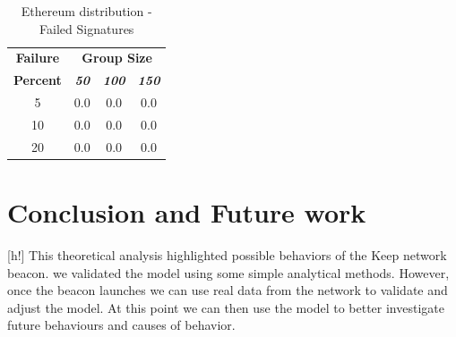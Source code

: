 \documentclass[conference]{IEEEtran}
\begin{document}
        \begin{table}[h!]
            \caption{Ethereum distribution - Failed Signatures}
            \begin{center}
            \begin{tabular}{|c|c|c|c|}
            \hline
            \textbf{Failure}&\multicolumn{3}{|c|}{\textbf{Group Size}} \\
            \cline{2-4} 
            \textbf{Percent} & \textbf{\textit{50}}& \textbf{\textit{100}}& \textbf{\textit{150}} \\
            \hline
            5 &  0.0 &  0.0 &  0.0 \\
            \hline
            10 &  0.0 &  0.0 &  0.0 \\
            \hline
            20 &  0.0 &  0.0 &  0.0 \\
            \hline
            \end{tabular}
            \label{failed_table2}
            \end{center}
        \end{table}

\newpage
\section{Conclusion and Future work}[h!]
This theoretical analysis highlighted possible behaviors of the Keep network beacon. we
validated the model using some simple analytical methods. However, once the beacon launches
we can use real data from the network to validate and adjust the model. At this point we can
then use the model to better investigate future behaviours and causes of behavior. 


\newpage


\end{document}
